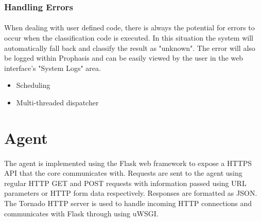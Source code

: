 \documentclass[bsc,logo,twoside,singlespacing,notimes]{infthesis}
\begin{document}
\subsubsection{Handling Errors}
\paragraph*{}
	When dealing with user defined code, there is always the potential for errors
	to occur when the classification code is executed.  In this situation the
	system will automatically fall back and classify the result as "unknown". The
	error will also be logged within Prophasis and can be easily viewed by the user
	in the web interface's "System Logs" area.

\begin{itemize}
	\item Scheduling
	\item Multi-threaded dispatcher
\end{itemize}

\section{Agent}
\paragraph*{}
	The agent is implemented using the Flask web framework to expose a HTTPS API
	that the core communicates with.  Requests are sent to the agent using regular
	HTTP GET and POST requests with information passed using URL parameters or HTTP
	form data respectively.  Responses are formatted as JSON.  The Tornado HTTP
	server is used to handle incoming HTTP connections and communicates with Flask
	through using uWSGI.
\end{document}
